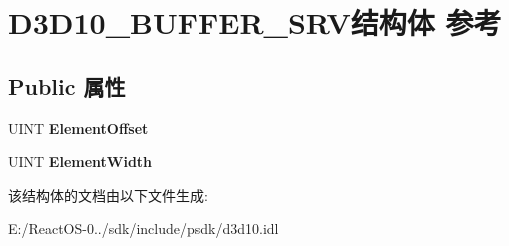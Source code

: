 \hypertarget{struct_d3_d10___b_u_f_f_e_r___s_r_v}{}\section{D3\+D10\+\_\+\+B\+U\+F\+F\+E\+R\+\_\+\+S\+R\+V结构体 参考}
\label{struct_d3_d10___b_u_f_f_e_r___s_r_v}
\subsection*{Public 属性}
\begin{DoxyCompactItemize}
\item 
\mbox{\label{struct_d3_d10___b_u_f_f_e_r___s_r_v_ab0df79abdee787dddeaa112ad2ec8ceb}} 
U\+I\+NT {\bfseries Element\+Offset}
\item 
\mbox{\label{struct_d3_d10___b_u_f_f_e_r___s_r_v_ae57a72c08a371bf5a2b21d6a82bcd534}} 
U\+I\+NT {\bfseries Element\+Width}
\end{DoxyCompactItemize}


该结构体的文档由以下文件生成\+:\begin{DoxyCompactItemize}
\item 
E\+:/\+React\+O\+S-\/0../sdk/include/psdk/d3d10.\+idl\end{DoxyCompactItemize}
